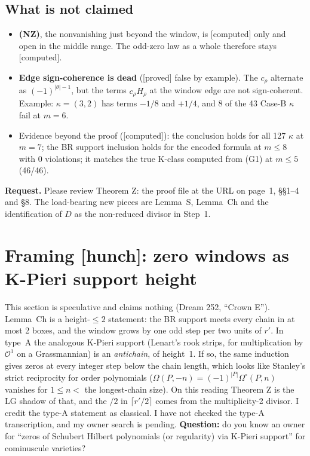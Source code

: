 \documentclass[10pt]{amsart}
\newcommand{\grade}[1]{\textsf{[#1]}}
\newcommand{\LG}{\mathrm{LG}}
\begin{document}
\subsection*{What is not claimed}
\begin{itemize}
\item \textbf{(NZ)}, the nonvanishing just beyond the window, is \grade{computed} only and open in the middle range. The
odd-zero law as a whole therefore stays \grade{computed}.
\item \textbf{Edge sign-coherence is dead} (\grade{proved} false by example). The $c_\rho$ alternate as $(-1)^{|\theta|-1}$, but
the terms $c_\rho H_\rho$ at the window edge are not sign-coherent. Example: $\kappa=(3,2)$ has terms $-1/8$ and $+1/4$, and 8 of
the 43 Case-B $\kappa$ fail at $m=6$.
\item Evidence beyond the proof (\grade{computed}): the conclusion holds for all 127 $\kappa$ at $m=7$; the BR support inclusion
holds for the encoded formula at $m\le8$ with 0 violations; it matches the true K-class computed from (G1) at $m\le5$
(46/46).
\end{itemize}

\textbf{Request.} Please review Theorem Z: the proof file at the URL on page~1, \S\S1--4 and \S8. The load-bearing new pieces
are Lemma~S, Lemma~Ch and the identification of $D$ as the non-reduced divisor in Step~1.

\section{Framing \grade{hunch}: zero windows as K-Pieri support height}

This section is speculative and claims nothing (Dream 252, ``Crown E''). Lemma~Ch is a height-$\le2$ statement: the BR support
meets every chain in at most 2 boxes, and the window grows by one odd step per two units of $r'$. In type~A the analogous K-Pieri
support (Lenart's rook strips, for multiplication by $\mathcal O^1$ on a Grassmannian) is an \emph{antichain}, of height~1. If
so, the same induction gives zeros at every integer step below the chain length, which looks like Stanley's strict reciprocity
for order polynomials ($\Omega(P,-n)=(-1)^{|P|}\Omega^\circ(P,n)$ vanishes for $1\le n<$ the longest-chain size). On this
reading Theorem Z is the $\LG$ shadow of that, and the $/2$ in $\lceil r'/2\rceil$ comes from the multiplicity-2 divisor. I
credit the type-A statement as classical. I have not checked the type-A transcription, and my owner search is pending.
\textbf{Question:} do you know an owner for ``zeros of Schubert Hilbert polynomials (or regularity) via K-Pieri support'' for
cominuscule varieties?
\end{document}
